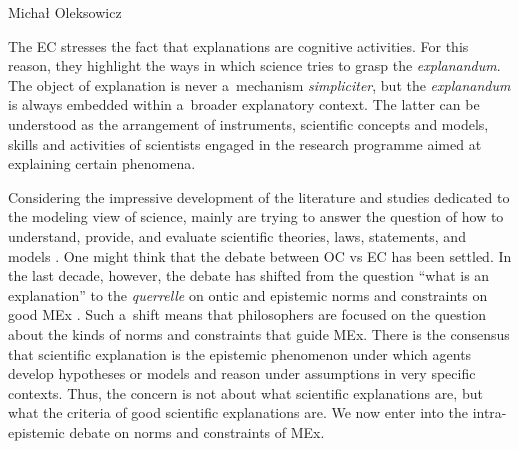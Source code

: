 \begin{artengenv}{Michał Oleksowicz}

The EC stresses the fact that explanations are cognitive activities. For this reason, they highlight the ways in which science tries to grasp the \textit{explanandum}. The object of explanation is never a~mechanism \textit{simpliciter}, but the \textit{explanandum} is always embedded within a~broader explanatory context. The latter can be understood as the arrangement of instruments, scientific concepts and models, skills and activities of scientists engaged in the research programme aimed at explaining certain phenomena.

Considering the impressive development of the literature and studies dedicated to the modeling view of science, mainly are trying to answer the question of how to understand, provide, and evaluate scientific theories, laws, statements, and models
\parencites[][]{meheus_models_2009}[][]{frigg_models_2022}. %
 One might think that the debate between OC vs EC has been settled. In the last decade, however, the debate has shifted from the question ``what is an explanation'' to the \textit{querrelle} on ontic and epistemic norms and constraints on good MEx 
\parencite[][]{illari_mechanistic_2013}. %
 Such a~shift means that philosophers are focused on the question about the kinds of norms and constraints that guide MEx. There is the consensus that scientific explanation is the epistemic phenomenon under which agents develop hypotheses or models and reason under assumptions in very specific contexts. Thus, the concern is not about what scientific explanations are, but what the criteria of good scientific explanations are. We now enter into the intra-epistemic debate on norms and constraints of MEx.


\end{artengenv}

